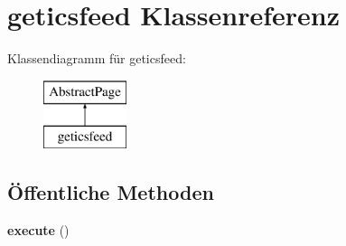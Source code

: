 \hypertarget{classgeticsfeed}{}\section{geticsfeed Klassenreferenz}
\label{classgeticsfeed}
Klassendiagramm für geticsfeed\+:\begin{figure}[H]
\begin{center}
\leavevmode
\includegraphics[height=2.000000cm]{classgeticsfeed}
\end{center}
\end{figure}
\subsection*{Öffentliche Methoden}
\begin{DoxyCompactItemize}
\item 
\mbox{\label{classgeticsfeed_af674e3d819da507e777960579e004e4a}} 
{\bfseries execute} ()
\end{DoxyCompactItemize}
